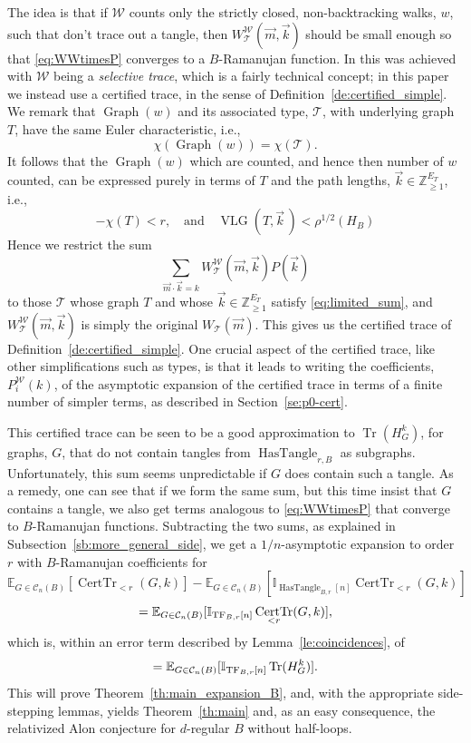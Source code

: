 \documentclass{memo-l}
\theoremstyle{plain}
\theoremstyle{definition}
\numberwithin{section}{chapter}
\numberwithin{equation}{chapter}
\newcommand{\integers}{{\mathbb Z}}
\newcommand{\rhoroot}[1]{\rho^{1/2}(H_{#1})}
\DeclareMathOperator{\HasTangle}{HasTangle}
\DeclareMathOperator{\Tr}{Tr}
\DeclareMathOperator{\CertTr}{CertTr}
\DeclareMathOperator{\VLG}{VLG}
\DeclareMathOperator{\Graph}{Graph}
\theoremstyle{plain}
\theoremstyle{definition}
\newcommand\EE{\mathbb{E}}
\newcommand\II{\mathbb{I}}
\newcommand\cC{\mathcal{C}}
\newcommand\cT{\mathcal{T}}
\newcommand\cW{\mathcal{W}}
\begin{document}
The idea is that if \( \cW \) counts only the strictly closed,
non-backtracking walks, \( w \), such that don't trace out a tangle, then
\( W^\cW_\cT(\vec m,\vec k) \) should be small enough so that
\eqref{eq:WWtimesP} converges to a \( B \)-Ramanujan function. In
\cite{friedman_alon} this was achieved with \( \cW \) being a
\emph{selective trace}, which is a fairly technical concept; in this paper
we instead use a 
\gls{certified trace}, in the sense of Definition~\ref{de:certified_simple}.
We remark that \( \Graph(w) \) and its associated type, \( \cT \), with
underlying graph \(T\), have the same Euler characteristic, i.e.,
$$
\chi(\Graph(w)) = \chi(\cT) .
$$
It follows that the $\Graph(w)$ which are counted, and hence then number
of $w$ counted, can be expressed purely in terms of $T$ and the path
lengths, $\vec k\in\integers_{\ge 1}^{E_T}$, i.e.,
\begin{equation}\label{eq:limited_sum}
-\chi(T) < r, \quad\mbox{and}\quad
\VLG(T,\vec k\,) < \rhoroot B
\end{equation}
Hence we restrict the sum
$$
\sum_{\vec m\cdot \vec k = k}
W^\cW_\cT(\vec m,\vec k) P(\vec k)
$$
to those $\cT$ whose graph $T$ and whose 
$\vec k\in\integers_{\ge 1}^{E_T}$ satisfy
\eqref{eq:limited_sum}, and
\( W^\cW_\cT(\vec m,\vec k) \) is simply the
original \( W_\cT(\vec m) \).
This gives us the certified trace of 
Definition~\ref{de:certified_simple}.
One crucial aspect of
the certified trace, like other simplifications such as types, is that it
leads to writing the 
\glspl{coefficient}, $P_i^\cW(k)$, of
the \gls{asymptotic expansion} of the certified trace
in terms of a finite number of simpler terms,
as described in Section~\ref{se:p0-cert}.

This certified trace
can be seen to be a good approximation to \( \Tr(H_G^k) \), for
graphs, \( G \), that do not contain tangles from 
$\HasTangle_{r,B}$
as subgraphs. Unfortunately, this sum seems
unpredictable if \( G \) does contain such a tangle. As a remedy, one can
see that if we form the same sum, but this time insist that \( G \)
contains a tangle, we also get terms analogous to \eqref{eq:WWtimesP} that
converge to \( B \)-Ramanujan functions.
Subtracting the two sums, as explained in
Subsection~\ref{sb:more_general_side},
we get a $1/n$-asymptotic expansion to
order $r$ with $B$-Ramanujan coefficients for 
$$
\EE_{G \in \cC_n(B)}[ \CertTr_{<r}(G,k) ]  -
\EE_{G \in \cC_n(B)}[ \II_{\HasTangle_{B,r}[n]} \CertTr_{<r}(G,k) ] 
$$
$$
= \EE_{G \in \cC_n(B)}[ \II_{{\rm TF}_{B,r}[n]} \CertTr_{<r}(G,k) ] ,
$$
which is, within an error term described by
Lemma~\ref{le:coincidences}, of
$$
= \EE_{G \in \cC_n(B)}[ \II_{{\rm TF}_{B,r}[n]} \Tr(H_G^k) ] .
$$
This will prove Theorem~\ref{th:main_expansion_B}, and, with
the appropriate side-stepping lemmas, yields
Theorem~\ref{th:main} and, as an easy consequence,
the relativized Alon conjecture for $d$-regular $B$ without half-loops.
\end{document}
